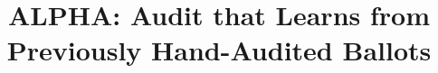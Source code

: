 \documentclass[aoas]{imsart}
\begin{document}
\begin{frontmatter}
\title{ALPHA: Audit that Learns from Previously Hand-Audited Ballots}


\begin{aug}
\author[A]{~ 
}
\address[A]{Department of Statistics, University of California, Berkeley}
\end{aug}


\end{frontmatter}
\end{document}
